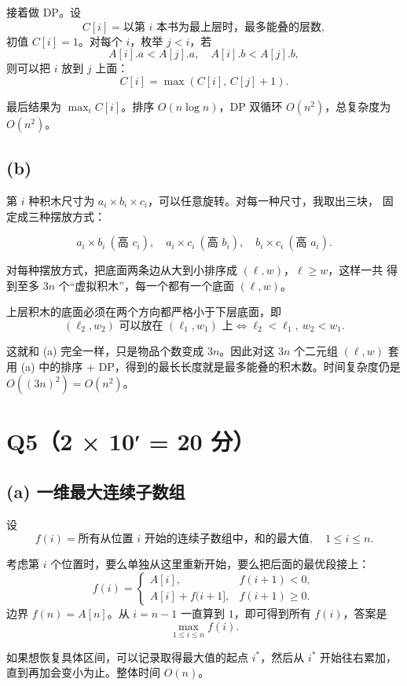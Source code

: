 \documentclass[12pt,a4paper,oneside]{ctexart}
\begin{document}
接着做 DP。设
\[
C[i]=\text{以第 $i$ 本书为最上层时，最多能叠的层数},
\]
初值 $C[i]=1$。对每个 $i$，枚举 $j<i$，若
\[
A[i].a<A[j].a,\quad A[i].b<A[j].b,
\]
则可以把 $i$ 放到 $j$ 上面：
\[
C[i]=\max(C[i],\,C[j]+1).
\]

最后结果为 $\max_i C[i]$。排序 $O(n\log n)$，DP 双循环 $O(n^2)$，总复杂度为 $O(n^2)$。

\subsection*{(b)}

第 $i$ 种积木尺寸为 $a_i\times b_i\times c_i$，可以任意旋转。对每一种尺寸，我取出三块，
固定成三种摆放方式：

\[
a_i\times b_i\ (\text{高 }c_i),\quad
a_i\times c_i\ (\text{高 }b_i),\quad
b_i\times c_i\ (\text{高 }a_i).
\]

对每种摆放方式，把底面两条边从大到小排序成 $(\ell,w)$，$\ell\ge w$，这样一共
得到至多 $3n$ 个“虚拟积木”，每一个都有一个底面 $(\ell,w)$。

上层积木的底面必须在两个方向都严格小于下层底面，即
\[
(\ell_2,w_2)\text{ 可以放在 }(\ell_1,w_1)\text{ 上} \iff
\ell_2<\ell_1,\ w_2<w_1.
\]

这就和 (a) 完全一样，只是物品个数变成 $3n$。因此对这 $3n$ 个二元组 $(\ell,w)$ 套用
(a) 中的排序 + DP，得到的最长长度就是最多能叠的积木数。时间复杂度仍是
$O((3n)^2)=O(n^2)$。

\section*{Q5（2 × 10′ = 20 分）}

\subsection*{(a) 一维最大连续子数组}

设
\[
f(i)=\text{所有从位置 $i$ 开始的连续子数组中，和的最大值},\quad 1\le i\le n.
\]

考虑第 $i$ 个位置时，要么单独从这里重新开始，要么把后面的最优段接上：
\[
f(i)=
\begin{cases}
A[i], & f(i+1)<0,\\[4pt]
A[i]+f(i+1], & f(i+1)\ge 0.
\end{cases}
\]
边界 $f(n)=A[n]$。从 $i=n-1$ 一直算到 $1$，即可得到所有 $f(i)$，答案是
\[
\max_{1\le i\le n} f(i).
\]

如果想恢复具体区间，可以记录取得最大值的起点 $i^*$，然后从 $i^*$ 开始往右累加，
直到再加会变小为止。整体时间 $O(n)$。
\end{document}
